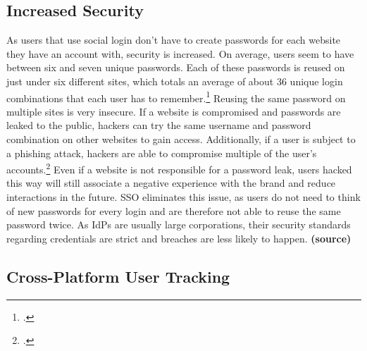 
\subsection{Increased Security}

As users that use social login don't have to create passwords for each website they have an account with, security is increased.
On average, users seem to have between six and seven unique passwords. Each of these passwords is reused on just
under six different sites, which totals an average of about 36 unique login combinations that each user has to remember.\footcite[Cp.][p. 4]{Florencio2006}
Reusing the same password on multiple sites is very insecure.
If a website is compromised and passwords are leaked to the public, hackers can try the same username and password
combination on other websites to gain access. Additionally, if a user is subject to a phishing attack,
hackers are able to compromise multiple of the user's accounts.\footcite[Cp.][]{McDade2022}
Even if a website is not responsible for a password leak, users hacked this way will still associate a negative
experience with the brand and reduce interactions in the future.
\ac{SSO} eliminates this issue, as users do not need to think of new passwords for every login and are therefore
not able to reuse the same password twice.
As \acp{IdP} are usually large corporations, their security standards regarding credentials are strict and
breaches are less likely to happen. \textbf{(source)}

%


\subsection{Cross-Platform User Tracking}